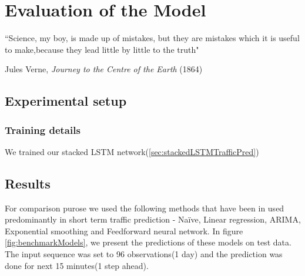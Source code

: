 
\chapter{Evaluation of the Model} %

\label{Chapter5} %


``Science, my boy, is made up of mistakes, but they are mistakes which it is useful to make,because
they lead little by little to the truth"

\begin{flushright}
Jules Verne, \textit{Journey to the Centre of the Earth} (1864)
\end{flushright}


\section{Experimental setup}

\subsection{Training details}
We trained our stacked LSTM network(\ref{sec:stackedLSTMTrafficPred})

\section{Results}

For comparison purose we used the following methods that have been in used predominantly in short
term traffic prediction - Naïve, Linear regression, ARIMA, Exponential smoothing and Feedforward
neural network. In figure \ref{fig:benchmarkModels}, we present the predictions of these models
on test data. The input sequence was set to 96 observations(1 day) and the prediction was done for
next 15 minutes(1 step ahead).


